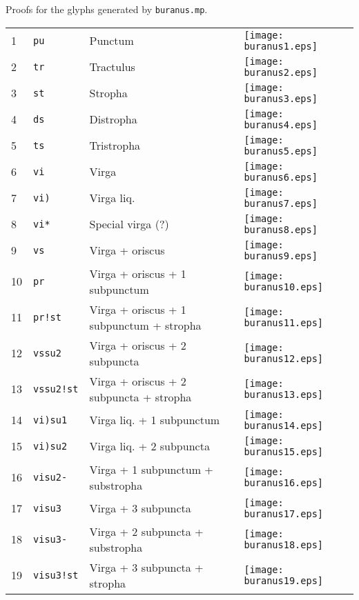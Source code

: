 \documentclass{scrarticle}
\begin{document}
Proofs for the glyphs generated by \texttt{buranus.mp}.

\vspace{1cm}

\begin{longtable}{l|l|l|l}
1 & \texttt{pu} & Punctum & \texttt{[image: buranus1.eps]} \\
2 & \texttt{tr} & Tractulus & \texttt{[image: buranus2.eps]} \\
3 & \texttt{st} & Stropha & \texttt{[image: buranus3.eps]} \\
4 & \texttt{ds} & Distropha & \texttt{[image: buranus4.eps]} \\
5 & \texttt{ts} & Tristropha & \texttt{[image: buranus5.eps]} \\
6 & \texttt{vi} & Virga & \texttt{[image: buranus6.eps]} \\
7 & \texttt{vi)} & Virga liq. & \texttt{[image: buranus7.eps]} \\
8 & \texttt{vi*} & Special virga (?) & \texttt{[image: buranus8.eps]} \\
9 & \texttt{vs} & Virga + oriscus & \texttt{[image: buranus9.eps]} \\
10 & \texttt{pr} & Virga + oriscus + 1 subpunctum & \texttt{[image: buranus10.eps]} \\
11 & \texttt{pr!st} & Virga + oriscus + 1 subpunctum + stropha & \texttt{[image: buranus11.eps]} \\
12 & \texttt{vssu2} & Virga + oriscus + 2 subpuncta & \texttt{[image: buranus12.eps]} \\
13 & \texttt{vssu2!st} & Virga + oriscus + 2 subpuncta + stropha & \texttt{[image: buranus13.eps]} \\
14 & \texttt{vi)su1} & Virga liq. + 1 subpunctum & \texttt{[image: buranus14.eps]} \\
15 & \texttt{vi)su2} & Virga liq. + 2 subpuncta & \texttt{[image: buranus15.eps]} \\
16 & \texttt{visu2-} & Virga + 1 subpunctum + substropha & \texttt{[image: buranus16.eps]} \\
17 & \texttt{visu3} & Virga + 3 subpuncta & \texttt{[image: buranus17.eps]} \\
18 & \texttt{visu3-} & Virga + 2 subpuncta + substropha & \texttt{[image: buranus18.eps]} \\
19 & \texttt{visu3!st} & Virga + 3 subpuncta + stropha & \texttt{[image: buranus19.eps]} \\

\end{longtable}
\end{document}
